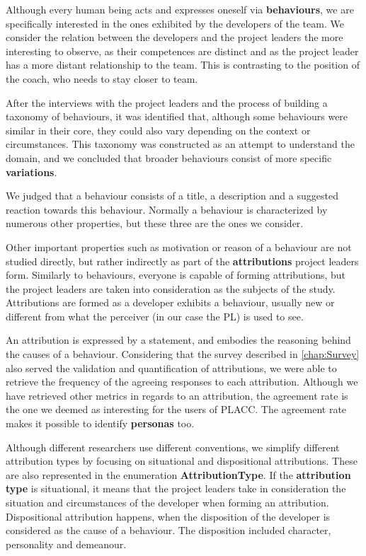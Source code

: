 Although every human being acts and expresses oneself via \textbf{behaviours}, we are specifically interested in the ones exhibited by the developers of the team. We consider the relation between the developers and the project leaders the more interesting to observe, as their competences are distinct and as the project leader has a more distant relationship to the team. This is contrasting to the position of the coach, who needs to stay closer to team.

After the interviews with the project leaders and the process of building a taxonomy of behaviours, it was identified that, although some behaviours were similar in their core, they could also vary depending on the context or circumstances. This taxonomy was constructed as an attempt to understand the domain, and we concluded that broader behaviours consist of more specific \textbf{variations}.

We judged that a behaviour consists of a title, a description and a suggested reaction towards this behaviour. Normally a behaviour is characterized by numerous other properties, but these three are the ones we consider.

Other important properties such as motivation or reason of a behaviour are not studied directly, but rather indirectly as part of the \textbf{attributions} project leaders form. Similarly to behaviours, everyone is capable of forming attributions, but the project leaders are taken into consideration as the subjects of the study. Attributions are formed as a developer exhibits a behaviour, usually new or different from what the perceiver (in our case the PL) is used to see. 

An attribution is expressed by a statement, and embodies the reasoning behind the causes of a behaviour. Considering that the survey described in \autoref{chap:Survey} also served the validation and quantification of attributions, we were able to retrieve the frequency of the agreeing responses to each attribution. Although we have retrieved other metrics in regards to an attribution, the agreement rate is the one we deemed as interesting for the users of PLACC. The agreement rate makes it possible to identify \textbf{personas} too.

Although different researchers use different conventions,  we simplify different attribution types by focusing on situational and dispositional attributions.  These are also represented in the enumeration \textbf{AttributionType}. If the \textbf{attribution type} is situational, it means that the project leaders take in consideration the situation and circumstances of the developer when forming an attribution. Dispositional attribution happens, when the disposition of the developer is considered as the cause of a behaviour. The disposition included character, personality and demeanour.

